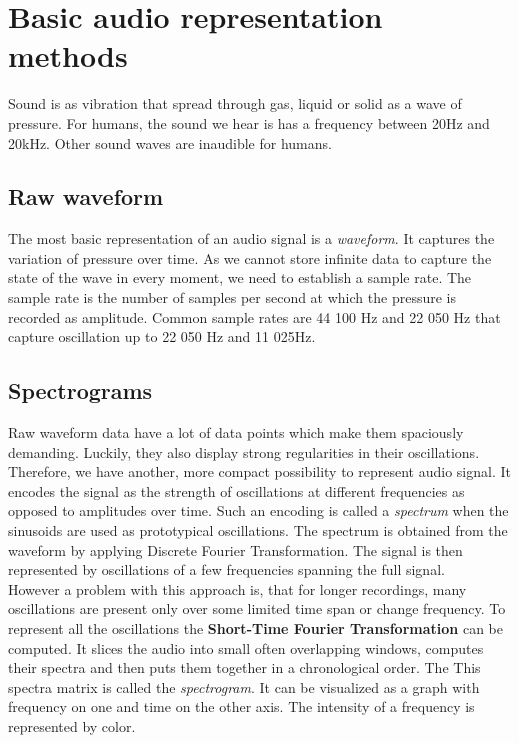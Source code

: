 \section{Basic audio representation methods}
Sound is as vibration that spread through gas, liquid or solid as a wave of pressure. For humans, the sound we hear is has a frequency between 20Hz and 20kHz. Other sound waves are inaudible for humans. \\

\subsection{Raw waveform}
The most basic representation of an audio signal is a \textit{waveform}. It captures the variation of pressure over time. As we cannot store infinite data to capture the state of the wave in every moment, we need to establish a sample rate. The sample rate is the number of samples per second at which the pressure is recorded as amplitude. Common sample rates are 44 100 Hz and 22 050 Hz that capture oscillation up to 22 050 Hz and 11 025Hz.
\subsection{Spectrograms}
Raw waveform data have a lot of data points which make them spaciously demanding. Luckily, they also display strong regularities in their oscillations. Therefore, we have another, more compact possibility to represent audio signal. It encodes the signal as the strength of oscillations at different frequencies as opposed to amplitudes over time. Such an encoding is called a \textit{spectrum} when the sinusoids are used as prototypical oscillations.
The spectrum is obtained from the waveform by applying Discrete Fourier Transformation. The signal is then represented by oscillations of a few frequencies spanning the full signal. \\
However a problem with this approach is, that for longer recordings, many oscillations are present only over some limited time span or change frequency. To represent all the oscillations the \textbf{Short-Time Fourier Transformation} can be computed. It slices the audio into small often overlapping windows, computes their spectra and then puts them together in a chronological order. The This spectra matrix is called the \textit{spectrogram}. It can be visualized as a graph with frequency on one and time on the other axis. The intensity of a frequency is represented by color.

